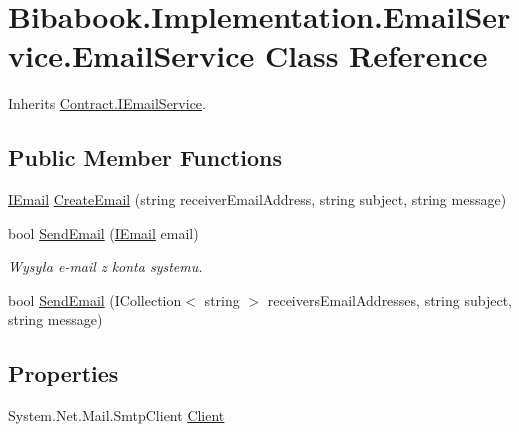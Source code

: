 \hypertarget{class_bibabook_1_1_implementation_1_1_email_service_1_1_email_service}{}\section{Bibabook.\+Implementation.\+Email\+Service.\+Email\+Service Class Reference}
\label{class_bibabook_1_1_implementation_1_1_email_service_1_1_email_service}


Inherits \hyperlink{interface_contract_1_1_i_email_service}{Contract.\+I\+Email\+Service}.

\subsection*{Public Member Functions}
\begin{DoxyCompactItemize}
\item 
\hyperlink{interface_contract_1_1_i_email}{I\+Email} \hyperlink{class_bibabook_1_1_implementation_1_1_email_service_1_1_email_service_a11c5b062ce9466198e8e1867d98132f2}{Create\+Email} (string receiver\+Email\+Address, string subject, string message)
\item 
bool \hyperlink{class_bibabook_1_1_implementation_1_1_email_service_1_1_email_service_a50ff5fcda3821c245f32052c2793f713}{Send\+Email} (\hyperlink{interface_contract_1_1_i_email}{I\+Email} email)
\begin{DoxyCompactList}\small\item\em Wysyła e-\/mail z konta systemu. \end{DoxyCompactList}\item 
bool \hyperlink{class_bibabook_1_1_implementation_1_1_email_service_1_1_email_service_aa00b042fe958ce792c99c3c5101b24a3}{Send\+Email} (I\+Collection$<$ string $>$ receivers\+Email\+Addresses, string subject, string message)
\end{DoxyCompactItemize}
\subsection*{Properties}
\begin{DoxyCompactItemize}
\item 
System.\+Net.\+Mail.\+Smtp\+Client \hyperlink{class_bibabook_1_1_implementation_1_1_email_service_1_1_email_service_a8bcc8888961a94b44a79bedaa82fbe63}{Client}
\end{DoxyCompactItemize}


